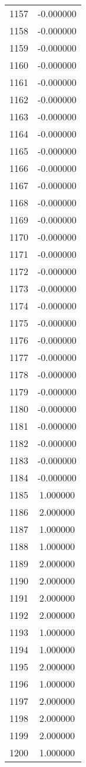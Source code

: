 \documentclass[12pt]{article}
\begin{document}
\begin{longtable}{@{}cc@{}}
1157 & -0.000000 \\
1158 & -0.000000 \\
1159 & -0.000000 \\
1160 & -0.000000 \\
1161 & -0.000000 \\
1162 & -0.000000 \\
1163 & -0.000000 \\
1164 & -0.000000 \\
1165 & -0.000000 \\
1166 & -0.000000 \\
1167 & -0.000000 \\
1168 & -0.000000 \\
1169 & -0.000000 \\
1170 & -0.000000 \\
1171 & -0.000000 \\
1172 & -0.000000 \\
1173 & -0.000000 \\
1174 & -0.000000 \\
1175 & -0.000000 \\
1176 & -0.000000 \\
1177 & -0.000000 \\
1178 & -0.000000 \\
1179 & -0.000000 \\
1180 & -0.000000 \\
1181 & -0.000000 \\
1182 & -0.000000 \\
1183 & -0.000000 \\
1184 & -0.000000 \\
1185 & 1.000000 \\
1186 & 2.000000 \\
1187 & 1.000000 \\
1188 & 1.000000 \\
1189 & 2.000000 \\
1190 & 2.000000 \\
1191 & 2.000000 \\
1192 & 2.000000 \\
1193 & 1.000000 \\
1194 & 1.000000 \\
1195 & 2.000000 \\
1196 & 1.000000 \\
1197 & 2.000000 \\
1198 & 2.000000 \\
1199 & 2.000000 \\
1200 & 1.000000 \\

\end{longtable}
\end{document}
